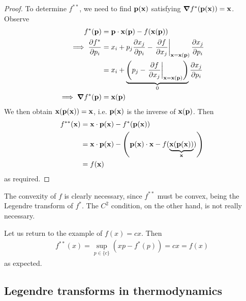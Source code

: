 \documentclass{../../template/note}
\begin{document}
    \begin{proof}
        To determine $f^{**}$, we need to find $\V p(\V x)$ satisfying $\grad f^*(\V p(\V x)) = \V x$. Observe
        \begin{align*}
            f^*(\V p) &= \V p \cdot \V x(\V p) - f(\V x(\V p)) \\
            \implies \pd{f^*}{p_i} &= x_i + p_j \pd{x_j}{p_i} - \pd[\V x = \V x(\V p)]{f}{x_j} \pd{x_j}{p_i} \\
            &= x_i + \underbrace{\left(p_j - \pd[\V x = \V x(\V p)]{f}{x_j}\right)}_0 \pd{x_j}{p_i} \\
            \implies \grad f^*(\V p) &= \V x(\V p)
        \end{align*}
        We then obtain $\V x(\V p(\V x)) = \V x$, i.e. $\V p(\V x)$ is the inverse of $\V x(\V p)$. Then
        \begin{align*}
            f^{**}(\V x) &= \V x \cdot \V p(\V x) - f^*(\V p(\V x)) \\
            &= \V x \cdot \V p(\V x) - \left(\V p(\V x) \cdot \V x - f(\underbrace{\V x(\V p(\V x))}_{\V x})\right) \\
            &= f(\V x)
        \end{align*}
        as required.        
    \end{proof}
    
    \begin{remark*}
        The convexity of $f$ is clearly necessary, since $f^{**}$ must be convex, being the Legendre transform of $f^*$. The $C^2$ condition, on the other hand, is not really necessary.
    \end{remark*}
    
    \begin{example*}
        Let us return to the example of $f(x) = cx$. Then
        \begin{align*}
            f^{**}(x) = \sup_{p \in \{c\}} \left(xp-f^*(p)\right) = cx = f(x)
        \end{align*}
        as expected.
    \end{example*}
    
    \subsection{Legendre transforms in thermodynamics}
\end{document}

